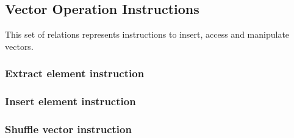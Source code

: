 \subsection{Vector Operation Instructions}
This set of relations represents instructions to insert, access and manipulate vectors.

\subsubsection{Extract element instruction}

\subsubsection{Insert element instruction}

\subsubsection{Shuffle vector instruction}
